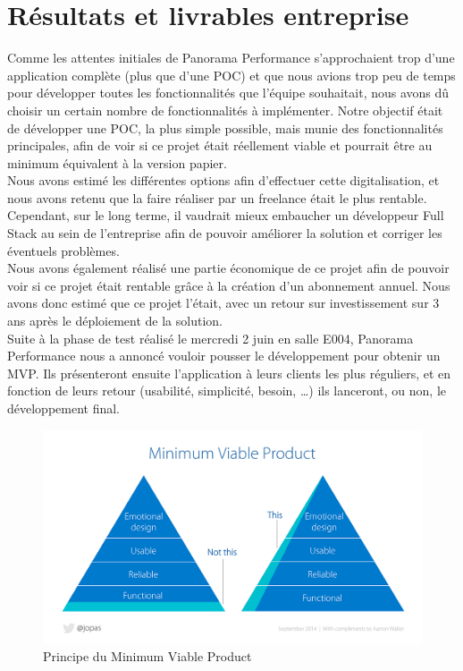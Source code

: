 \section{Résultats et livrables entreprise}
Comme les attentes initiales de Panorama Performance s’approchaient trop d’une application complète (plus que d’une POC) et que nous avions trop peu de temps pour développer toutes les fonctionnalités que l’équipe souhaitait, nous avons dû choisir un certain nombre de fonctionnalités à implémenter. Notre objectif était de développer une POC, la plus simple possible, mais munie des fonctionnalités principales, afin de voir si ce projet était réellement viable et pourrait être au minimum équivalent à la version papier. \\

Nous avons estimé les différentes options afin d’effectuer cette digitalisation, et nous avons retenu que la faire réaliser par un freelance était le plus rentable. Cependant, sur le long terme, il vaudrait mieux embaucher un développeur Full Stack au sein de l’entreprise afin de pouvoir améliorer la solution et corriger les éventuels problèmes.\\

Nous avons également réalisé une partie économique de ce projet afin de pouvoir voir si ce projet était rentable grâce à la création d’un abonnement annuel. Nous avons donc estimé que ce projet l’était, avec un retour sur investissement sur 3 ans après le déploiement de la solution.\\

 Suite à la phase de test réalisé le mercredi 2 juin en salle E004, Panorama Performance nous a annoncé vouloir pousser le développement pour obtenir un MVP. Ils présenteront ensuite l'application à leurs clients les plus réguliers, et en fonction de leurs retour (usabilité, simplicité, besoin, \dots) ils lanceront, ou non, le développement final.\\
 
 \begin{figure}[!h]
     \centering
     \includegraphics[scale=0.3]{img/MVP.png}
     \caption{Principe du Minimum Viable Product}
     \label{fig:my_label}
 \end{figure}

